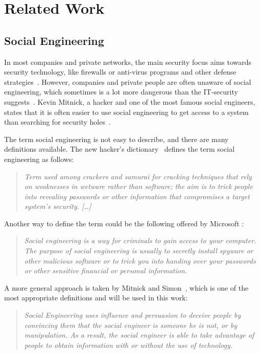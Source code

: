 \chapter{Related Work}
\label{chap:relatedwork}

\section{Social Engineering}

In most companies and private networks, the main security focus aims towards
security technology, like firewalls or anti-virus programs and other defense
strategies~\cite{winkler1995}. However, companies and private people are often
unaware of social engineering, which sometimes is a lot more dangerous than the
IT-security suggests~\cite{jones2004}. Kevin Mitnick, a hacker and one of the
most famous social engineers, states that it is often easier to use social
engineering to get access to a system than searching for security
holes~\cite{mitnick2003}.

The term social engineering is not easy to describe, and there are many
definitions available. 
The new hacker's dictionary~\cite{raymond1996} defines the term social engineering as
follows:
\begin{quote}
\textit{Term used among crackers and samurai for cracking techniques that rely on
weaknesses in wetware rather than software; the aim is to trick people into
revealing passwords or other information that compromises a target system's
security. [\dots]}
\end{quote}

Another way to define the term could be the following offered by Microsoft
\cite{microsoft2009}:
\begin{quote}
\textit{Social engineering is a way for criminals to gain access to your computer. The
purpose of social engineering is usually to secretly install spyware or other
malicious software or to trick you into handing over your passwords or other
sensitive financial or personal information.}
\end{quote}

A more general approach is taken by Mitnick and Simon~\cite{mitnick2003}, which
is one of the most appropriate definitions and will be used in this work:
\begin{quote}
\textit{Social Engineering uses influence and persuasion to deceive people
by convincing them that the social engineer is someone he is not,
or by manipulation. As a result, the social engineer is able to take
advantage of people to obtain information with or without the use of
technology.}
\end{quote}


